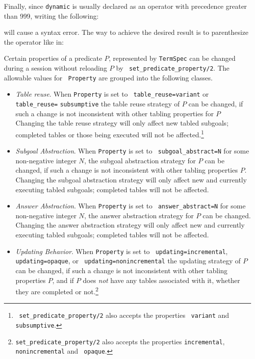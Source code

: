 \begin{description}
    Finally, since {\tt dynamic} is usually declared as an operator with 
    precedence greater than 999, writing the following:


    will cause a syntax error. The way to achieve the desired result is to
    parenthesize the operator like in:



%
Certain properties of a predicate $P$, represented by {\tt TermSpec}
can be changed during a session without reloading $P$ by {\tt
  set\_predicate\_property/2}.  The allowable values for {\tt
  Property} are grouped into the following classes.
\begin{itemize}
\item {\em Table reuse}.  When {\tt Property} is set to {\tt
  table\_reuse=variant} or {\tt table\_reuse=} {\tt subsumptive} the
  table reuse strategy of $P$ can be changed, if such a change is not
  inconsistent with other tabling properties for $P$ Changing the
  table reuse strategy will only affect new tabled subgoals; completed
  tables or those being executed will not be affected.\footnote{{\tt
      set\_predicate\_property/2} also accepts the properties {\tt
      variant} and {\tt subsumptive}.}
%
\item {\em Subgoal Abstraction}.  When {\tt Property} is set to {\tt
  subgoal\_abstract=N} for some non-negative integer $N$, the subgoal
  abstraction strategy for $P$ can be changed, if such a change is not
  inconsistent with other tabling properties $P$.  Changing the
  subgoal abstraction strategy will only affect new and currently
  executing tabled subgoals; completed tables will not be affected.
%
\item {\em Answer Abstraction}.  When {\tt Property} is set to {\tt
  answer\_abstract=N} for some non-negative integer $N$, the answer
  abstraction strategy for $P$ can be changed.  Changing the answer
  abstraction strategy will only affect new and currently executing
  tabled subgoals; completed tables will not be affected.
% 
\item {\em Updating Behavior}.  When {\tt Property} is set to {\tt
  updating=incremental}, {\tt updating=opaque}, or {\tt
  updating=nonincremental} the updating strategy of $P$ can be
  changed, if such a change is not inconsistent with other tabling
  properties $P$, and if $P$ does {\em not} have any
  tables associated with it, whether they are completed or
  not.\footnote{{\tt set\_predicate\_property/2} also accepts the
    properties {\tt incremental}, {\tt nonincremental} and {\tt
      opaque}.}
\end{itemize}


\end{description}
